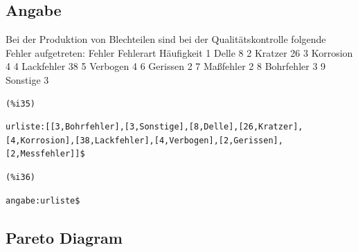 \documentclass{article}
\begin{document}
\subsection{Angabe }


Bei der Produktion von Blechteilen sind bei der Qualitätskontrolle folgende Fehler aufgetreten:
Fehler      Fehlerart   Häufigkeit
    1       Delle        8
    2       Kratzer     26
    3       Korrosion    4
    4       Lackfehler  38
    5       Verbogen     4
    6       Gerissen     2
    7       Maßfehler    2
    8       Bohrfehler   3
    9       Sonstige     3

\noindent
\begin{minipage}[t]{8ex}{\color{red}\bf
\begin{verbatim}
(%i35) 
\end{verbatim}}
\end{minipage}
\begin{minipage}[t]{\textwidth}{\color{blue}
\begin{verbatim}
urliste:[[3,Bohrfehler],[3,Sonstige],[8,Delle],[26,Kratzer],[4,Korrosion],[38,Lackfehler],[4,Verbogen],[2,Gerissen],[2,Messfehler]]$
\end{verbatim}}
\end{minipage}


\noindent
\begin{minipage}[t]{8ex}{\color{red}\bf
\begin{verbatim}
(%i36) 
\end{verbatim}}
\end{minipage}
\begin{minipage}[t]{\textwidth}{\color{blue}
\begin{verbatim}
angabe:urliste$
\end{verbatim}}
\end{minipage}


\subsection{Pareto Diagram}
\end{document}
